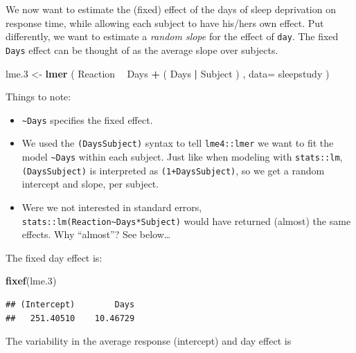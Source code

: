 \documentclass[]{book}
\newenvironment{Shaded}{\begin{snugshade}}{\end{snugshade}}
\newcommand{\DataTypeTok}[1]{\textcolor[rgb]{0.13,0.29,0.53}{#1}}
\newcommand{\FloatTok}[1]{\textcolor[rgb]{0.00,0.00,0.81}{#1}}
\newcommand{\KeywordTok}[1]{\textcolor[rgb]{0.13,0.29,0.53}{\textbf{#1}}}
\newcommand{\NormalTok}[1]{#1}
\newcommand{\OperatorTok}[1]{\textcolor[rgb]{0.81,0.36,0.00}{\textbf{#1}}}
\newcommand{\StringTok}[1]{\textcolor[rgb]{0.31,0.60,0.02}{#1}}
\providecommand{\tightlist}{%
  \setlength{\itemsep}{0pt}\setlength{\parskip}{0pt}}
\theoremstyle{definition}
\theoremstyle{definition}
\theoremstyle{definition}
\theoremstyle{remark}
\begin{document}
We now want to estimate the (fixed) effect of the days of sleep deprivation on response time, while allowing each subject to have his/hers own effect.
Put differently, we want to estimate a \emph{random slope} for the effect of \texttt{day}.
The fixed \texttt{Days} effect can be thought of as the average slope over subjects.

\begin{Shaded}
\begin{Highlighting}[]
\NormalTok{lme}\FloatTok{.3}\NormalTok{ <-}\StringTok{ }\KeywordTok{lmer}\NormalTok{ ( Reaction }\OperatorTok{~}\StringTok{ }\NormalTok{Days }\OperatorTok{+}\StringTok{ }\NormalTok{( Days }\OperatorTok{|}\StringTok{ }\NormalTok{Subject ) , }\DataTypeTok{data=}\NormalTok{ sleepstudy )}
\end{Highlighting}
\end{Shaded}

Things to note:

\begin{itemize}
\tightlist
\item
  \texttt{\textasciitilde{}Days} specifies the fixed effect.
\item
  We used the \texttt{(Days\textbar{}Subject)} syntax to tell \texttt{lme4::lmer} we want to fit the model \texttt{\textasciitilde{}Days} within each subject. Just like when modeling with \texttt{stats::lm}, \texttt{(Days\textbar{}Subject)} is interpreted as \texttt{(1+Days\textbar{}Subject)}, so we get a random intercept and slope, per subject.
\item
  Were we not interested in standard errors, \texttt{stats::lm(Reaction\textasciitilde{}Days*Subject)} would have returned (almost) the same effects. Why ``almost''? See below\ldots{}
\end{itemize}

The fixed day effect is:

\begin{Shaded}
\begin{Highlighting}[]
\KeywordTok{fixef}\NormalTok{(lme}\FloatTok{.3}\NormalTok{)}
\end{Highlighting}
\end{Shaded}

\begin{verbatim}
## (Intercept)        Days 
##   251.40510    10.46729
\end{verbatim}

The variability in the average response (intercept) and day effect is

\begin{Shaded}
\end{Shaded}
\end{document}
